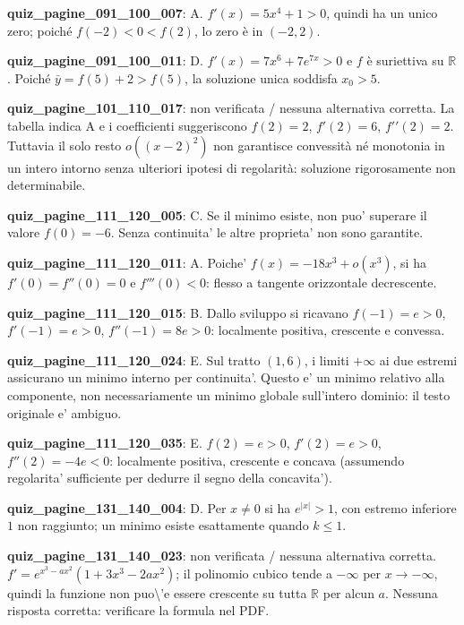\documentclass[11pt,a4paper]{article}
\newcounter{quiz}
\begin{document}
\noindent\textbf{quiz\_pagine\_091\_100\_007}: A. $f\prime(x)=5x^4+1>0$, quindi ha un unico zero; poiché $f(-2)<0<f(2)$, lo zero è in $(-2,2)$.\par\medskip
\noindent\textbf{quiz\_pagine\_091\_100\_011}: D. $f\prime(x)=7x^6+7e^{7x}>0$ e $f$ è suriettiva su $\mathbb R$. Poiché $\bar y=f(5)+2>f(5)$, la soluzione unica soddisfa $x_0>5$.\par\medskip
\noindent\textbf{quiz\_pagine\_101\_110\_017}: non verificata / nessuna alternativa corretta. La tabella indica A e i coefficienti suggeriscono $f(2)=2$, $f\prime(2)=6$, $f\prime\prime(2)=2$. Tuttavia il solo resto $o((x-2)^2)$ non garantisce convessità né monotonia in un intero intorno senza ulteriori ipotesi di regolarità: soluzione rigorosamente non determinabile.\par\medskip
\noindent\textbf{quiz\_pagine\_111\_120\_005}: C. Se il minimo esiste, non puo' superare il valore $f(0)=-6$. Senza continuita' le altre proprieta' non sono garantite.\par\medskip
\noindent\textbf{quiz\_pagine\_111\_120\_011}: A. Poiche' $f(x)=-18x^3+o(x^3)$, si ha $f'(0)=f''(0)=0$ e $f'''(0)<0$: flesso a tangente orizzontale decrescente.\par\medskip
\noindent\textbf{quiz\_pagine\_111\_120\_015}: B. Dallo sviluppo si ricavano $f(-1)=e>0$, $f'(-1)=e>0$, $f''(-1)=8e>0$: localmente positiva, crescente e convessa.\par\medskip
\noindent\textbf{quiz\_pagine\_111\_120\_024}: E. Sul tratto $(1,6)$, i limiti $+\infty$ ai due estremi assicurano un minimo interno per continuita'. Questo e' un minimo relativo alla componente, non necessariamente un minimo globale sull'intero dominio: il testo originale e' ambiguo.\par\medskip
\noindent\textbf{quiz\_pagine\_111\_120\_035}: E. $f(2)=e>0$, $f'(2)=e>0$, $f''(2)=-4e<0$: localmente positiva, crescente e concava (assumendo regolarita' sufficiente per dedurre il segno della concavita').\par\medskip
\noindent\textbf{quiz\_pagine\_131\_140\_004}: D. Per $x\neq0$ si ha $e^{|x|}>1$, con estremo inferiore $1$ non raggiunto; un minimo esiste esattamente quando $k\le1$.\par\medskip
\noindent\textbf{quiz\_pagine\_131\_140\_023}: non verificata / nessuna alternativa corretta. $f\prime=e^{x^3-ax^2}(1+3x^3-2ax^2)$; il polinomio cubico tende a $-\infty$ per $x\to-\infty$, quindi la funzione non puo\textbackslash{}'e essere crescente su tutta $\mathbb R$ per alcun $a$. Nessuna risposta corretta: verificare la formula nel PDF.\par\medskip
\end{document}
